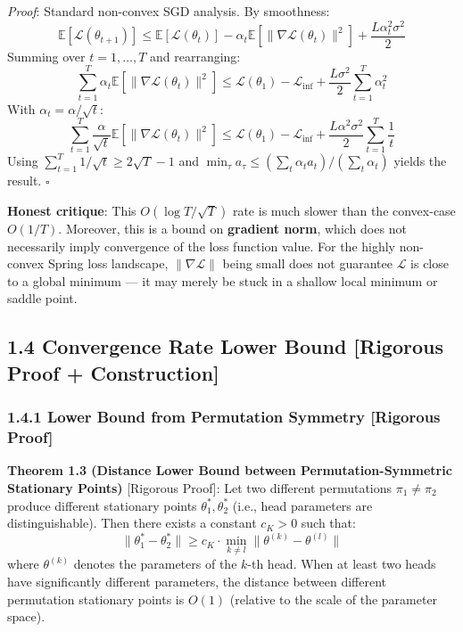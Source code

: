 \documentclass[
  12pt,
]{article}
\begin{document}
\emph{Proof}: Standard non-convex SGD analysis. By smoothness:
\[\mathbb{E}[\mathcal{L}(\theta_{t+1})] \leq \mathbb{E}[\mathcal{L}(\theta_t)] - \alpha_t \mathbb{E}[\|\nabla\mathcal{L}(\theta_t)\|^2] + \frac{L\alpha_t^2\sigma^2}{2}\]
Summing over $t = 1, \ldots, T$ and rearranging:
\[\sum_{t=1}^{T} \alpha_t \mathbb{E}[\|\nabla\mathcal{L}(\theta_t)\|^2] \leq \mathcal{L}(\theta_1) - \mathcal{L}_{\inf} + \frac{L\sigma^2}{2}\sum_{t=1}^{T} \alpha_t^2\]
With $\alpha_t = \alpha / \sqrt{t}$:
\[\sum_{t=1}^{T} \frac{\alpha}{\sqrt{t}} \mathbb{E}[\|\nabla\mathcal{L}(\theta_t)\|^2] \leq \mathcal{L}(\theta_1) - \mathcal{L}_{\inf} + \frac{L\alpha^2\sigma^2}{2} \sum_{t=1}^{T} \frac{1}{t}\]
Using $\sum_{t=1}^{T} 1/\sqrt{t} \geq 2\sqrt{T} - 1$ and $\min_{\tau} a_\tau \leq (\sum_t \alpha_t a_t) / (\sum_t \alpha_t)$ yields the result. $\square$

\textbf{Honest critique}: This $O(\log T / \sqrt{T})$ rate is much slower than the convex-case $O(1/T)$. Moreover, this is a bound on \textbf{gradient norm}, which does not necessarily imply convergence of the loss function value. For the highly non-convex Spring loss landscape, $\|\nabla\mathcal{L}\|$ being small does not guarantee $\mathcal{L}$ is close to a global minimum --- it may merely be stuck in a shallow local minimum or saddle point.

\subsection{1.4 Convergence Rate Lower Bound [Rigorous Proof + Construction]}\label{convergence-rate-lower-bound}

\subsubsection{1.4.1 Lower Bound from Permutation Symmetry [Rigorous Proof]}\label{lower-bound-permutation-symmetry}

\textbf{Theorem 1.3 (Distance Lower Bound between Permutation-Symmetric Stationary Points)} [Rigorous Proof]: Let two different permutations $\pi_1 \neq \pi_2$ produce different stationary points $\theta_1^*, \theta_2^*$ (i.e., head parameters are distinguishable). Then there exists a constant $c_K > 0$ such that:
\[\boxed{\|\theta_1^* - \theta_2^*\| \geq c_K \cdot \min_{k \neq l} \|\theta^{(k)} - \theta^{(l)}\|}\]
where $\theta^{(k)}$ denotes the parameters of the $k$-th head. When at least two heads have significantly different parameters, the distance between different permutation stationary points is $O(1)$ (relative to the scale of the parameter space).
\end{document}
